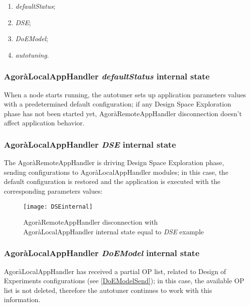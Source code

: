 \begin{enumerate}

    \item \textit{defaultStatus};
    
    \item \textit{DSE};
    
    \item \textit{DoEModel};
    
    \item \textit{autotuning}.

\end{enumerate}


\subsubsection{AgoràLocalAppHandler \textit{defaultStatus} internal state}

When a node starts running, the autotuner sets up application parameters values with a predetermined default configuration; if any Design Space Exploration phase has not been started yet, AgoràRemoteAppHandler disconnection doesn't affect application behavior.


\subsubsection{AgoràLocalAppHandler \textit{DSE} internal state}

The AgoràRemoteAppHandler is driving Design Space Exploration phase, sending configurations to AgoràLocalAppHandler modules; in this case, the default configuration is restored and the application is executed with the corresponding parameters values:

\begin{figure}[H]

    \centering
    \texttt{[image: DSEinternal]}
    \caption{AgoràRemoteAppHandler disconnection with AgoràLocalAppHandler internal state equal to \textit{DSE} example}
    
\end{figure}


\subsubsection{AgoràLocalAppHandler \textit{DoEModel} internal state}

AgoràLocalAppHandler has received a partial OP list, related to Design of Experiments configurations (see \ref{DoEModelSend}); in this case, the available OP list is not deleted, therefore the autotuner continues to work with this information.


